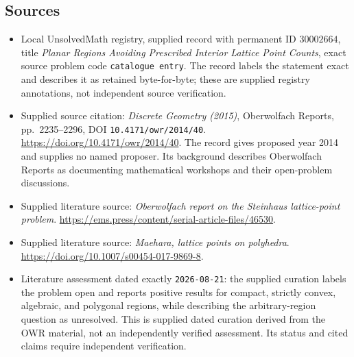 \documentclass[11pt]{article}
\begin{document}
\subsection{Sources}
\begin{itemize}
\item Local UnsolvedMath registry, supplied record with permanent ID \(30002664\), title \emph{Planar Regions Avoiding Prescribed Interior Lattice Point Counts}, exact source problem code \texttt{catalogue entry}. The record labels the statement exact and describes it as retained byte-for-byte; these are supplied registry annotations, not independent source verification.
\item Supplied source citation: \emph{Discrete Geometry (2015)}, Oberwolfach Reports, pp.\ 2235--2296, DOI \texttt{10.4171/owr/2014/40}. \url{https://doi.org/10.4171/owr/2014/40}. The record gives proposed year 2014 and supplies no named proposer. Its background describes Oberwolfach Reports as documenting mathematical workshops and their open-problem discussions.
\item Supplied literature source: \emph{Oberwolfach report on the Steinhaus lattice-point problem}. \url{https://ems.press/content/serial-article-files/46530}.
\item Supplied literature source: \emph{Maehara, lattice points on polyhedra}. \url{https://doi.org/10.1007/s00454-017-9869-8}.
\item Literature assessment dated exactly \texttt{2026-08-21}: the supplied curation labels the problem open and reports positive results for compact, strictly convex, algebraic, and polygonal regions, while describing the arbitrary-region question as unresolved. This is supplied dated curation derived from the OWR material, not an independently verified assessment. Its status and cited claims require independent verification.
\end{itemize}
\end{document}
